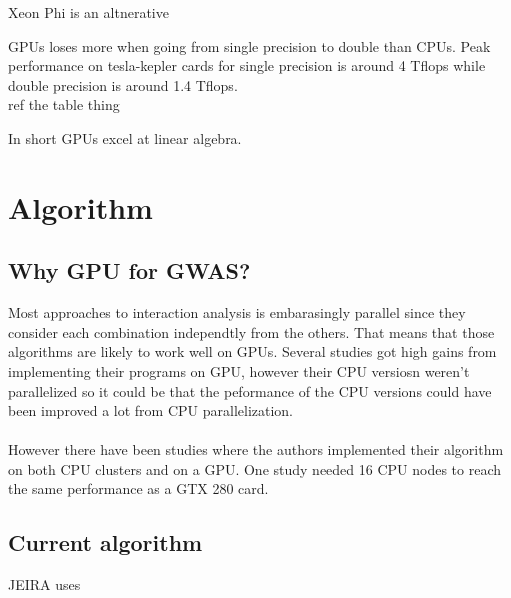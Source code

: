 \documentclass[10pt,a4paper]{article}
\begin{document}
Xeon Phi is an altnerative

GPUs loses more when going from single precision to double than CPUs. Peak performance on tesla-kepler cards for single precision is around 4 Tflops while double precision is around 1.4 Tflops. \cite{nvtesla}\\ ref the table thing

In short GPUs excel at linear algebra.

\clearpage
\section{Algorithm}


\subsection{Why GPU for GWAS?}
Most approaches to interaction analysis is embarasingly parallel since they consider each combination independtly from the others. That means that those algorithms are likely to work well on GPUs. Several studies got high gains from implementing their programs on GPU, however their CPU versiosn weren't parallelized so it could be that the peformance of the CPU versions could have been improved a lot from CPU parallelization.\cite{gwis,gboost,gmdr_gpu,cuda_lr,genie_2012,plink_gpu}\\
\\
However there have been studies where the authors implemented their algorithm on both CPU clusters and on a GPU. One study needed 16 CPU nodes to reach the same performance as a GTX 280 card\cite{jiang_accelerating}.







\subsection{Current algorithm}
JEIRA uses
\end{document}
